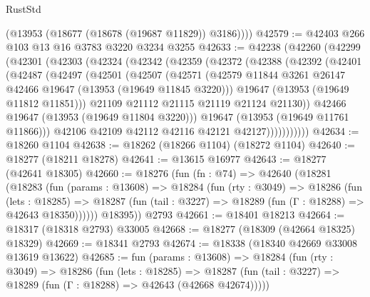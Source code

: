 \begin{lexlean}{RustStd}
\begin{coremodule}
        (@13953 (@18677 (@18678 (@19687 @11829)) @3186))))
@42579 := @42403 @266 @103 @13 @16 @3783 @3220 @3234 @3255
@42633 := @42238
    (@42260
      (@42299
        (@42301
          (@42303
            (@42324
              (@42342
                (@42359
                  (@42372
                    (@42388
                      (@42392
                        (@42401
                          (@42487
                            (@42497
                              (@42501
                                (@42507
                                  (@42571
                                    (@42579
                                      @11844
                                      @3261
                                      @26147
                                      @42466
                                      @19647
                                      (@13953 (@19649 @11845 @3220)))
                                    @19647
                                    (@13953 (@19649 @11812 @11851)))
                                  @21109
                                  @21112
                                  @21115
                                  @21119
                                  @21124
                                  @21130))
                              @42466
                              @19647
                              (@13953 (@19649 @11804 @3220)))
                            @19647
                            (@13953 (@19649 @11761 @11866)))
                          @42106
                          @42109
                          @42112
                          @42116
                          @42121
                          @42127)))))))))))
@42634 := @18260 @1104
@42638 := @18262 (@18266 @1104) (@18272 @1104)
@42640 := @18277 (@18211 @18278)
@42641 := @13615 @16977
@42643 := @18277 (@42641 @18305)
@42660 := @18276
    (fun (fn : @74) =>
    @42640
      (@18281
        (@18283
          (fun (params : @13608) =>
          @18284
            (fun (rty : @3049) =>
            @18286
              (fun (lets : @18285) =>
              @18287 (fun (tail : @3227) => @18289 (fun (Γ : @18288) => @42643 @18350))))))
        @18395))
    @2793
@42661 := @18401 @18213
@42664 := @18317 (@18318 @2793) @33005
@42668 := @18277 (@18309 (@42664 @18325) @18329)
@42669 := @18341 @2793
@42674 := @18338 (@18340 @42669 @33008 @13619 @13622)
@42685 := fun (params : @13608) =>
  @18284
    (fun (rty : @3049) =>
    @18286
      (fun (lets : @18285) =>
      @18287 (fun (tail : @3227) => @18289 (fun (Γ : @18288) => @42643 (@42668 @42674)))))

\end{coremodule}
\end{lexlean}
